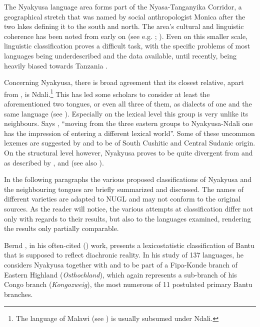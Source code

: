 The Nyakyusa language area forms part of the Nyasa-Tanganyika Corridor, a geographical stretch that was named by social anthropologist Monica \citet{WilsonM1958} after the two lakes defining it to the south and north. The area's cultural and linguistic coherence has been noted from early on (see e.g. \citealt{FuellebornF1906}; \citealt{JohnstonH1977}). Even on this smaller scale, linguistic classification proves a difficult task, with the specific problems of most languages being underdescribed and the data available, until recently, being heavily biased towards Tanzania \citep{NurseD1988}.

Concerning Nyakyusa, there is broad agreement that its closest relative, apart from , is Ndali.\footnote{The  language of Malawi (see \citealt{KershnerT2002}) is usually subsumed under Ndali.} This has led some scholars to consider at least the aforementioned two tongues, or even all three of them, as dialects of one and the same language (see \citealt[9]{WilsonM1958}). Especially on the lexical level this group is very unlike its neighbours. Says \citet[72f]{NurseD1988}, ``moving from the three eastern groups to Nyakyusa-Ndali one has the impression of entering a different lexical world''. Some of these uncommon lexemes are suggested by \citet{NurseD1988} and \citet{EhretC1973} to be of South Cushitic and Central Sudanic origin. On the structural level however, Nyakyusa proves to be quite divergent from  and  as described by \citet{BotneR2008}, \citet{LabroussiC1998} and \citet{KishindoP1999} (see also \citealt[55]{NurseD1988}).%

In the following paragraphs the various proposed classifications of Nyakyusa and the neighbouring tongues are briefly summarized and discussed. The names of different varieties are adapted to NUGL \citep{MahoJ2009} and may not conform to the original sources. As the reader will notice, the various attempts at classification differ not only with regards to their results, but also to the languages examined, rendering the results only partially comparable.

Bernd \citeauthor{HeineB1972}, in his often-cited (\citeyear{HeineB1972}) work, presents a lexicostatistic classification of Bantu that is supposed to reflect diachronic reality. In his study of 137 languages, he considers Nyakyusa together with  and  to be part of a Fipa-Konde branch of Eastern Highland (\textit{Osthochland}), which again represents a sub-branch of his Congo branch (\textit{Kongozweig}), the most numerous of 11 postulated primary Bantu branches.


